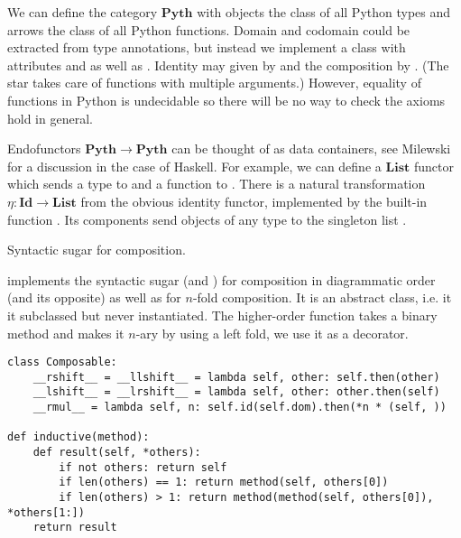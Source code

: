 \begin{example}\label{ex:python categories}
We can define the category $\mathbf{Pyth}$ with objects the class of all Python types and arrows the class of all Python functions.
Domain and codomain could be extracted from type annotations, but instead we implement a class  with attributes  and  as well as .
Identity may given by  and the composition by . (The star takes care of functions with multiple arguments.)
However, equality of functions in Python is undecidable so there will be no way to check the axioms hold in general.

Endofunctors $\mathbf{Pyth} \to \mathbf{Pyth}$ can be thought of as data containers, see Milewski~\cite{Milewski14} for a discussion in the case of Haskell.
For example, we can define a $\mathbf{List}$ functor which sends a type  to  and a function  to .
There is a natural transformation $\eta : \mathbf{Id} \to \mathbf{List}$ from the obvious identity functor, implemented by the built-in function .
Its components send objects  of any type  to the singleton list .
\end{example}

\begin{python}
{\normalfont Syntactic sugar for composition.}

 implements the syntactic sugar  (and ) for composition in diagrammatic order (and its opposite) as well as  for $n$-fold composition.
It is an abstract class, i.e. it it subclassed but never instantiated.
The higher-order function  takes a binary method and makes it $n$-ary by using a left fold, we use it as a decorator.

\begin{verbatim}
class Composable:
    __rshift__ = __llshift__ = lambda self, other: self.then(other)
    __lshift__ = __lrshift__ = lambda self, other: other.then(self)
    __rmul__ = lambda self, n: self.id(self.dom).then(*n * (self, ))

def inductive(method):
    def result(self, *others):
        if not others: return self
        if len(others) == 1: return method(self, others[0])
        if len(others) > 1: return method(method(self, others[0]), *others[1:])
    return result
\end{verbatim}
\end{python}

